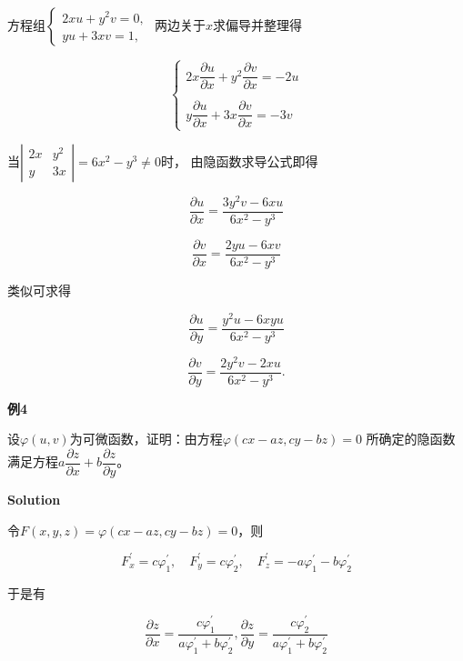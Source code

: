 \documentclass[12pt, a4paper]{article}
\numberwithin{equation}{section}
\begin{document}
    方程组$\left\{\begin{array}{l}2 x u+y^2 v=0, \\ y u+3 x v=1,\end{array}\right.$
    两边关于\(x\)求偏导并整理得

    $$
        \left\{\begin{array}{l}
            2 x \dfrac{\partial u}{\partial x}+y^2 \dfrac{\partial v}{\partial x}=-2 u \\ \\
            y \dfrac{\partial u}{\partial x}+3 x \dfrac{\partial v}{\partial x}=-3 v
        \end{array}\right.
    $$

    当$\left|\begin{array}{cc}2 x & y^2 \\ y & 3 x\end{array}\right|=6 x^2-y^3 \neq 0$时，
    由隐函数求导公式即得

    $$
        \frac{\partial u}{\partial x}=\frac{3 y^2 v-6 x u}{6 x^2-y^3}
    $$

    $$
        \frac{\partial v}{\partial x}=\frac{2 y u-6 x v}{6 x^2-y^3}
    $$

    类似可求得

    $$
        \frac{\partial u}{\partial y}=\frac{y^2 u-6 x y u}{6 x^2-y^3}
    $$

    $$
        \frac{\partial v}{\partial y}=\frac{2 y^2 v-2 x u}{6 x^2-y^3} .
    $$

    \textbf{例4}
    \vspace{1em}

    设\(\varphi\left(u,v\right)\)为可微函数，证明：由方程\(\varphi\left(cx-az, cy-bz\right)=0\)
    所确定的隐函数满足方程\(a \dfrac{\partial z}{\partial x}+b \dfrac{\partial z}{\partial y}\)。
    \vspace{1em}

    \textbf{Solution}
    \vspace{1em}

    令$F(x, y, z)=\varphi(c x-a z, c y-b z)=0$，则

    $$
        F_x^{\prime}=c \varphi_1^{\prime}, \quad F_y^{\prime}=c \varphi_2^{\prime}, \quad F_z^{\prime}=-a \varphi_1^{\prime}-b \varphi_2^{\prime}
    $$

    于是有

    $$
        \frac{\partial z}{\partial x}=\frac{c \varphi_1^{\prime}}{a \varphi_1^{\prime}+b \varphi_2^{\prime}},
        \frac{\partial z}{\partial y}=\frac{c \varphi_2^{\prime}}{a \varphi_1^{\prime}+b \varphi_2^{\prime}}
    $$
\end{document}

